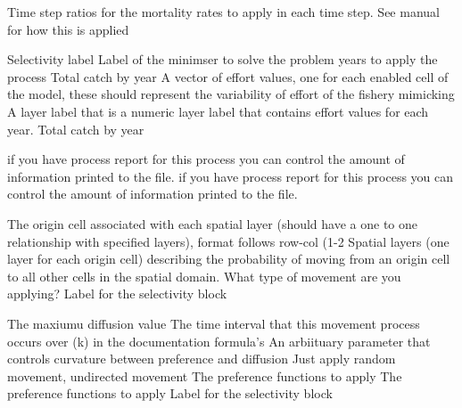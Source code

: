  {Time step ratios for the mortality rates to apply in each time step. See manual for how this is applied}
 {}
\par\textbf{}\par
{} {Selectivity label}
 {Label of the minimser to solve the problem}
 {years to apply the process}
 {Total catch by year}
 {A vector of effort values, one for each enabled cell of the model, these should represent the variability of effort of the fishery mimicking}
 {A layer label that is a numeric layer label that contains effort values for each year.}
 {Total catch by year}
\par\textbf{}\par
{} {if you have process report for this process you can control the amount of information printed to the file.}
 {if you have process report for this process you can control the amount of information printed to the file.}
\par\textbf{}\par
{} {The origin cell associated with each spatial layer (should have a one to one relationship with specified layers), format follows row-col (1-2}
 {Spatial layers (one layer for each origin cell) describing the probability of moving from an origin cell to all other cells in the spatial domain.}
 {What type of movement are you applying?}
 {Label for the selectivity block}
\par\textbf{}\par
{} {The maxiumu diffusion value}
 {The time interval that this movement process occurs over (k) in the documentation formula's}
 {An arbiituary parameter that controls curvature between preference and diffusion}
 {Just apply random movement, undirected movement}
 {The preference functions to apply}
 {The preference functions to apply}
 {Label for the selectivity block}
\par\textbf{}\par
